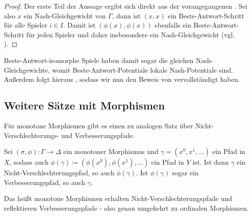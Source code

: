\begin{proof}
	Der erste Teil der Aussage ergibt sich direkt aus der vorangegangenen . Sei also $x$ ein Nash-Gleichgewicht von $\Gamma$, dann ist $(x,x)$ ein Beste-Antwort-Schritt für alle Spieler $i \in I$. Damit ist $(\phi(x), \phi(x))$ ebenfalls ein Beste-Antwort-Schritt für jeden Spieler und daher insbesondere ein Nash-Gleichgewicht (vgl. ).
\end{proof}

Beste-Antwort-isomorphe Spiele haben damit sogar die gleichen Nash-Gleichgewichte, womit Beste-Antwort-Potentiale lokale Nash-Potentiale sind. Außerdem folgt hieraus , sodass wir nun den Beweis von  vervollständigt haben.


\subsection{Weitere Sätze mit Morphismen}


Für monotone Morphismen gibt es einen zu  analogen Satz über Nicht-Verschlechterungs- und Verbesserungspfade.

\begin{prop}
	Sei $(\sigma, \phi): \Gamma \to \Delta$ ein monotoner Morphismus und $\gamma = (x^0, x^1, \dots)$ ein Pfad in $X$, sodass auch $\phi(\gamma) \coloneqq (\phi(x^0), \phi(x^1), \dots)$ ein Pfad in $Y$ ist. Ist dann $\gamma$ ein Nicht-Verschlechterungspfad, so auch $\phi(\gamma)$. Ist $\phi(\gamma)$ sogar ein Verbesserungspfad, so auch $\gamma$.
\end{prop}

Das heißt monotone Morphismen erhalten Nicht-Verschlechterungspfade und reflektieren Verbesserungspfade - also genau umgekehrt zu ordinalen Morphismen.

